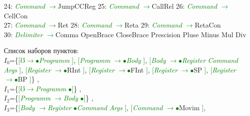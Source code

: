 \documentclass[a0]{a0poster}
\begin{document}
24: \textcolor{Green}{\textit{Command}} \textcolor{Green}{$\to$}JumpCCReg 25: \textcolor{Green}{\textit{Command}} \textcolor{Green}{$\to$}CallRel 26: \textcolor{Green}{\textit{Command}} \textcolor{Green}{$\to$}CellCon \\
27: \textcolor{Green}{\textit{Command}} \textcolor{Green}{$\to$}Ret 28: \textcolor{Green}{\textit{Command}} \textcolor{Green}{$\to$}Reta 29: \textcolor{Green}{\textit{Command}} \textcolor{Green}{$\to$}RetaCon \\
30: \textcolor{Green}{\textit{Delimiter}} \textcolor{Green}{$\to$}Comma OpenBrace CloseBrace Prescision Pluse Minus Mul Div  

  
Список наборов пунктов:\\
$I_{0}$=\{\textcolor{Green}{[}\textcolor{Green}{$\mho$}\textcolor{Green}{$\to$}\textcolor{Green}{$\bullet$}\textcolor{Green}{\textit{Programm}} \textcolor{Green}{]}, \textcolor{Green}{[}\textcolor{Green}{\textit{Programm}} \textcolor{Green}{$\to$}\textcolor{Green}{$\bullet$}\textcolor{Green}{\textit{Body}} \textcolor{Green}{]}, \textcolor{Green}{[}\textcolor{Green}{\textit{Body}} \textcolor{Green}{$\to$}\textcolor{Green}{$\bullet$}\textcolor{Green}{\textit{Register}} \textcolor{Green}{\textit{Command}} \textcolor{Green}{\textit{Args}} \textcolor{Green}{]}, \textcolor{Green}{[}\textcolor{Green}{\textit{Register}} \textcolor{Green}{$\to$}\textcolor{Green}{$\bullet$}RInt \textcolor{Green}{]}, \textcolor{Green}{[}\textcolor{Green}{\textit{Register}} \textcolor{Green}{$\to$}\textcolor{Green}{$\bullet$}FInt \textcolor{Green}{]}, \textcolor{Green}{[}\textcolor{Green}{\textit{Register}} \textcolor{Green}{$\to$}\textcolor{Green}{$\bullet$}SP \textcolor{Green}{]}, \textcolor{Green}{[}\textcolor{Green}{\textit{Register}} \textcolor{Green}{$\to$}\textcolor{Green}{$\bullet$}BP \textcolor{Green}{]}\}
,\\
$I_{1}$=\{\textcolor{Green}{[}\textcolor{Green}{$\mho$}\textcolor{Green}{$\to$}\textcolor{Green}{\textit{Programm}} \textcolor{Green}{$\bullet$}\textcolor{Green}{]}\}
,\\
$I_{2}$=\{\textcolor{Green}{[}\textcolor{Green}{\textit{Programm}} \textcolor{Green}{$\to$}\textcolor{Green}{\textit{Body}} \textcolor{Green}{$\bullet$}\textcolor{Green}{]}\}
,\\
$I_{3}$=\{\textcolor{Green}{[}\textcolor{Green}{\textit{Body}} \textcolor{Green}{$\to$}\textcolor{Green}{\textit{Register}} \textcolor{Green}{$\bullet$}\textcolor{Green}{\textit{Command}} \textcolor{Green}{\textit{Args}} \textcolor{Green}{]}, \textcolor{Green}{[}\textcolor{Green}{\textit{Command}} \textcolor{Green}{$\to$}\textcolor{Green}{$\bullet$}Movim \textcolor{Green}{]},\\
\end{document}
